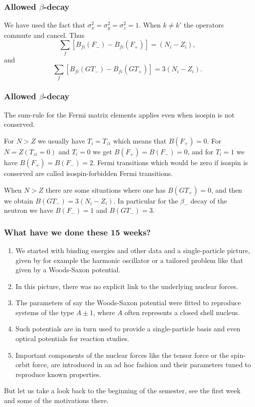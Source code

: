 \documentclass[compress]{beamer}
\begin{document}
 \frame
 {
 \frametitle{Allowed $\beta$-decay}
 \begin{small}
 {\scriptsize
We have used the fact that $  \sigma ^{2}_{x} = \sigma ^{2}_{y}=\sigma ^{2}_{z}=1  $.
When $  k \neq k'  $ the operators commute and cancel.
Thus
\[
\displaystyle\sum _{f} \left[ B_{fi}(F_{-}) - B_{fi}(F_{+}) \right] = (N_{i}-Z_{i}),       
\]
and
\[
\displaystyle\sum _{f} \left[ B_{fi}(GT_{-}) - B_{fi}(GT_{+}) \right] = 3(N_{i}-Z_{i}).       
\]
 }
 \end{small}
 }
 \frame
 {
 \frametitle{Allowed $\beta$-decay}
 \begin{small}
 {\scriptsize
The sum-rule for the Fermi matrix elements applies even
when isospin is not conserved.

For $  N > Z  $ we usually have
$  T_{i}=T_{zi}  $ which means that $  B(F_{+})=0  $.\newline
For $  N=Z (T_{zi}=0)  $ and $  T_{i}=0  $ we get 
$  B(F_{+})=B(F_{-})=0  $, and for $  T_{i}=1  $ we
have $  B(F_{+}) = B(F_{-}) = 2  $. Fermi transitions which would be zero
if isospin is conserved are called isospin-forbidden Fermi transitions.

When $  N > Z  $ there are some situations where one has $  B(GT_{+})=0  $,
and then we obtain $  B(GT_{-}) = 3(N_{i}-Z_{i})  $. In particular
for the $\beta_{-}$ decay of the neutron we have $  B(F_{-})=1  $
and $  B(GT_{-})=3  $.

 }
 \end{small}
 }



\frame
{
  \frametitle{What have we done these 15 weeks?}
\begin{enumerate}
\item We started with binding energies and other data and a single-particle picture, given by for example the harmonic oscillator or a tailored problem like that given by a  Woods-Saxon potential.

\item  In this picture, there was no explicit link to the underlying nuclear forces.
\item The parameters of say the Woods-Saxon potential were fitted to reproduce systems of the type
$A\pm 1$, where $A$ often represents a closed shell nucleus.
\item  Such potentials are in turn used to provide a single-particle basis and even optical potentials for reaction
studies.
\item Important components of the nuclear forces like the tensor force or the spin-orbit force, are introduced in an ad hoc fashion and their parameters
tuned to reproduce known properties.
\end{enumerate}
But let us take a look back to the beginning of the semester, see the first week and some of the motivations there.
}
\end{document}
